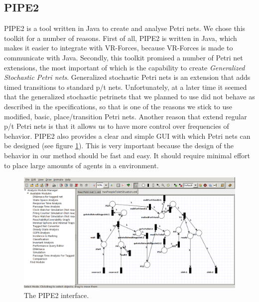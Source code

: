 \documentclass[11pt, a4paper]{book}
\begin{document}
\subsection{PIPE2}
PIPE2 is a tool written in Java to create and analyse Petri nets. We chose this toolkit for a number of reasons. First of all, PIPE2 is written in Java, which makes it easier to integrate with VR-Forces, because VR-Forces is made to communicate with Java. Secondly, this toolkit promised a number of Petri net extensions, the most important of which is the capability to create \emph{Generalized Stochastic Petri nets}. Generalized stochastic Petri nets is an extension that adds timed transitions to standard p/t nets. Unfortunately, at a later time it seemed that the generalized stochastic petrinets that we planned to use did not behave as described in the specifications, so that is one of the reasons we stick to use modified, basic, place/transition Petri nets. Another reason that extend regular p/t Petri nets is that it allows us to have more control over frequencies of behavior. PIPE2 also provides a clear and simple GUI with which Petri nets can be designed (see figure \ref{fig:pipegui}). This is very important because the design of the behavior in our method should be fast and easy. It should require minimal effort to place large amounts of agents in a environment. 

\begin{figure}
\centering
\includegraphics[width=.8\textwidth]{pipe_screenshot}
\caption{The PIPE2 interface.}
\label{fig:pipegui}
\end{figure}
\end{document}

